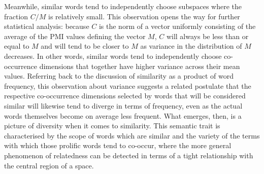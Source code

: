 Meanwhile, similar words tend to independently choose subspaces where the fraction $C/M$ is relatively small.  This observation opens the way for further statistical analysis: because $C$ is the norm of a vector uniformly consisting of the average of the PMI values defining the vector $M$, $C$ will always be less than or equal to $M$ and will tend to be closer to $M$ as variance in the distribution of $M$ decreases.  In other words, similar words tend to independently choose co-occurrence dimensions that together have higher variance across their mean values.  Referring back to the discussion of similarity as a product of word frequency, this observation about variance suggests a related postulate that the respective co-occurrence dimensions selected by words that will be considered similar will likewise tend to diverge in terms of frequency, even as the actual words themselves become on average less frequent.  What emerges, then, is a picture of diversity when it comes to similarity.  This semantic trait is characterised by the scope of words which are similar and the variety of the terms with which those prolific words tend to co-occur, where the more general phenomenon of relatedness can be detected in terms of a tight relationship with the central region of a space.

